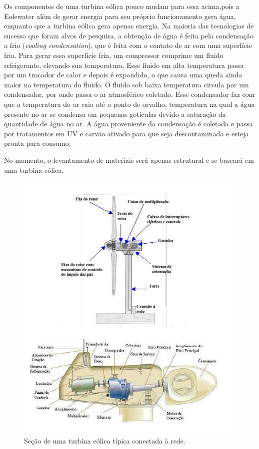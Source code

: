 
Os componentes de uma turbina eólica pouco mudam para essa acima,pois a Eolewater além de gerar energia para seu próprio
funcionamento gera água, enquanto que a turbina eólica gera apenas energia. Na maioria das tecnologias de sucesso que foram alvos de pesquisa,
a obtenção de água é feita pela condensação  a frio (\textit{cooling condensation}), que é feita com o contato de 
ar com uma superfície fria. Para gerar essa superfície fria, um compressor comprime um fluido refrigerante, elevando sua
temperatura. Esse fluido em alta temperatura passa por um trocador de calor e depois é expandido, o que causa uma queda 
ainda maior na temperatura do fluido. O fluido sob baixa temperatura circula por um condensador, por onde passa o ar 
atmosférico coletado. Esse condensador faz com que a temperatura do ar caia até o ponto de orvalho, temperatura na qual a
água presente no ar se condensa em pequenas gotículas devido a saturação da quantidade de água no ar. A água proveniente
da condensação é coletada e passa por tratamentos em UV e carvão ativado para que seja descontaminada e esteja pronta para
consumo.



No momento, o levantamento de materiais será apenas estrutural e se baseará em uma turbina eólica.

\begin{figure}[!htbp]
\centering
\includegraphics[scale=0.80]{editaveis/figuras/turbina}
\caption[Seção de uma turbina eólica]{Seção de uma turbina eólica típica conectada à rede.\footnotemark}
\FloatBarrier
\label{secao_turbina_eolica}
\end{figure}

